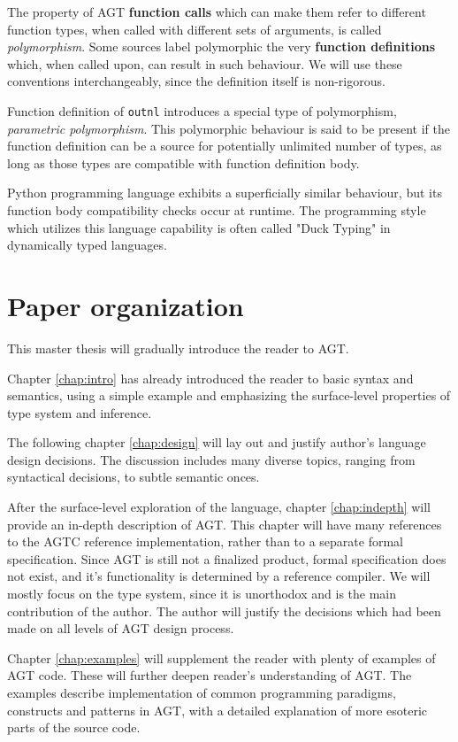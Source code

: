 \documentclass[times, utf8, diplomski]{fer}
\theoremstyle{definition}
\begin{document}
The property of AGT \textbf{function calls} which can make them refer to different function types, 
when called with different sets of arguments, is called \textit{polymorphism}.
Some sources label polymorphic the very \textbf{function definitions} which, when called upon, 
can result in such behaviour.
We will use these conventions interchangeably, since the definition itself is non-rigorous.

Function definition of \texttt{outnl} introduces a special type of polymorphism, 
\textit{parametric polymorphism}. This polymorphic behaviour is said to be present if the
function definition can be a source for potentially unlimited number of types, 
as long as those types are compatible with function definition body.

Python programming language exhibits a superficially similar behaviour, but its
function body compatibility checks occur at runtime. 
The programming style which utilizes this language capability is often called "Duck Typing" 
\citep{c_py_duck_typing} in dynamically typed languages.


\section{Paper organization}

This master thesis will gradually introduce the reader to AGT. 

Chapter \ref{chap:intro} has already introduced the reader to basic syntax and semantics,
using a simple example and emphasizing the surface-level properties of type system and inference. 

The following chapter \ref{chap:design} will lay out and justify author's
language design decisions. The discussion includes many diverse topics,
ranging from syntactical decisions, to subtle semantic onces.

After the surface-level exploration of the language, chapter \ref{chap:indepth}
will provide an in-depth description of AGT.
This chapter will have many references to the AGTC reference implementation, 
rather than to a separate formal specification. Since AGT is still not a finalized product,
formal specification does not exist, and it's functionality is determined by a reference compiler.
We will mostly focus on the type system, since it is unorthodox and is the main
contribution of the author.  The author will justify the decisions which had been
made on all levels of AGT design process.

Chapter \ref{chap:examples} will supplement the reader with plenty of examples of AGT code. These will
further deepen reader's understanding of AGT. The examples describe implementation
of common programming paradigms, constructs and patterns in AGT, with a detailed
explanation of more esoteric parts of the source code.
\end{document}
